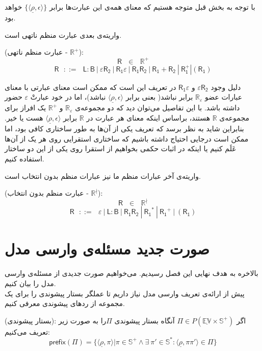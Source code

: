  با توجه به بخش قبل متوجه هستیم که معنای همه‌ی این عبارت‌ها برابر 
$\{\langle \underline{\rho} , \epsilon \rangle\}$
خواهد بود.

واریته‌ی بعدی عبارت منظم ناتهی است.
\begin{defn}
	(عبارت منظم ناتهی - $\mathbb{R}^+$):
	$$\mathsf{R} \:\:\:\in\:\:\: \mathbb{R}^+$$
	$$\mathsf{R}\:\:\: ::= \:\:\: \mathsf{L:B} \: |
	\: \mathsf{\varepsilon R_2} \: | \: \mathsf{R_1 \varepsilon} \: |
	\: \mathsf{R_1 R_2} \: | 
	\: \mathsf{R_1 + R_2} \: | \: \mathsf{R_1^+} | (\mathsf{R_1})$$
\end{defn}
دلیل وجود 
$\mathsf{\varepsilon R_2}$
و 
$\mathsf{R_1 \varepsilon}$
در تعریف این است که ممکن است معنای عبارتی با معنای عبارات عضو $\mathbb{R}_\varepsilon$ برابر نباشد( بعنی برابر ${\langle \underline{\rho} , \epsilon \rangle}$ نباشد)، اما در خود عبارتْ $\varepsilon$ حضور داشته باشد. با این تفاصیل می‌توان دید که دو مجموعه‌ی 
$\mathbb{R}_\varepsilon$
و
$\mathbb{R}^+$
یک افراز برای مجموعه‌ی $\mathbb{R}$ هستند، براساس اینکه معنای هر عبارت در $\mathbb{R}$ برابر ${\langle \underline{\rho} , \epsilon \rangle}$ هست یا خیر. بنابراین شاید به نظر برسد که تعریف یکی از آن‌ها به طور ساختاری کافی بود، اما ممکن است درجایی احتیاج داشته باشیم که ساختاری استقرایی روی هر یک از آن‌ها عَلَم کنیم یا اینکه در اثبات حکمی بخواهیم از استقرا روی یکی از این دو ساختار استفاده کنیم.

واریته‌ی آخر عبارات منظم ما نیز عبارات منظم بدون انتخاب است.
\begin{defn}
(عبارت منظم بدون انتخاب - $\mathbb{R}^\nmid$):
$$
\mathsf{R}\:\:\: \in \:\:\: \mathbb{R}^\nmid$$
$$
\mathsf{R}\:\:\: ::= \:\:\: \varepsilon \: | \: \mathsf{L:B} \: | \:
\mathsf{R_1 R_2} \: | \: \mathsf{R_1}^* \: | \: \mathsf{R_1}^+ \: | \:
(\mathsf{R_1})$$
\end{defn}

\section{صورت جدید مسئله‌ی وارسی مدل}
بالاخره به هدف نهایی این فصل رسیدیم. می‌خواهیم صورت جدیدی از مسئله‌ی وارسی مدل را بیان ‌کنیم.\\
پیش از ارائه‌ی تعریف وارسی مدل نیاز داریم تا عملگر بستار پیشوندی را برای یک مجموعه از ردهای پیشوندی معرفی کنیم.
\begin{defn}
	(بستار پیشوندی):
	اگر 
	$\Pi \in \mathit{P}(\mathbb{\underline{EV}\times S^+})$
	آنگاه بستار پیشوندی $\Pi$را به صورت زیر تعریف می‌کنیم:
	$$\mathsf{prefix}(\Pi)=
	\{\langle \underline{\rho},\pi\rangle | \pi \in \mathbb{S^+} \land \exists\
	\pi' \in \mathbb{S^*}: \langle \underline{\rho}, \pi \pi' \rangle \in \Pi \}$$
\end{defn}

